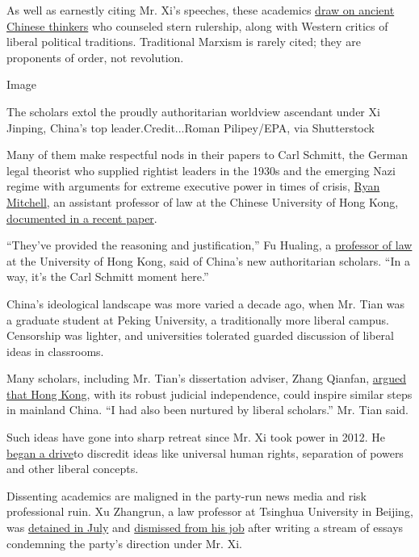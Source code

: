 As well as earnestly citing Mr. Xi's speeches, these academics
\href{http://www.ccps.gov.cn/bkjd/xzglgg/xzglgg2019_08/201909/t20190923_134457.shtml}{draw
on ancient Chinese thinkers} who counseled stern rulership, along with
Western critics of liberal political traditions. Traditional Marxism is
rarely cited; they are proponents of order, not revolution.

Image

The scholars extol the proudly authoritarian worldview ascendant under
Xi Jinping, China's top leader.Credit...Roman Pilipey/EPA, via
Shutterstock

Many of them make respectful nods in their papers to Carl Schmitt, the
German legal theorist who supplied rightist leaders in the 1930s and the
emerging Nazi regime with arguments for extreme executive power in times
of crisis,
\href{https://www.law.cuhk.edu.hk/app/people/prof-ryan-mitchell/}{Ryan
Mitchell}, an assistant professor of law at the Chinese University of
Hong Kong,
\href{https://papers.ssrn.com/sol3/papers.cfm?abstract_id=3400946}{documented
in a recent paper}.

``They've provided the reasoning and justification,'' Fu Hualing, a
\href{https://www.law.hku.hk/academic_staff/professor-fu-hualing/}{professor
of law} at the University of Hong Kong, said of China's new
authoritarian scholars. ``In a way, it's the Carl Schmitt moment here.''

China's ideological landscape was more varied a decade ago, when Mr.
Tian was a graduate student at Peking University, a traditionally more
liberal campus. Censorship was lighter, and universities tolerated
guarded discussion of liberal ideas in classrooms.

Many scholars, including Mr. Tian's dissertation adviser, Zhang Qianfan,
\href{http://www.calaw.cn/article/default.asp?id=1238}{argued that Hong
Kong}, with its robust judicial independence, could inspire similar
steps in mainland China. ``I had also been nurtured by liberal
scholars.'' Mr. Tian said.

Such ideas have gone into sharp retreat since Mr. Xi took power in 2012.
He
\href{https://www.nytimes.com/2013/08/20/world/asia/chinas-new-leadership-takes-hard-line-in-secret-memo.html}{began
a drive}to discredit ideas like universal human rights, separation of
powers and other liberal concepts.

Dissenting academics are maligned in the party-run news media and risk
professional ruin. Xu Zhangrun, a law professor at Tsinghua University
in Beijing, was
\href{https://www.nytimes.com/2020/07/12/world/asia/xu-zhangrun-china-xi.html}{detained
in July} and
\href{https://chinadigitaltimes.net/2020/07/xi-critic-xu-zhangrun-released-from-detention-fired-from-tsinghua-university/}{dismissed
from his job} after writing a stream of essays condemning the party's
direction under Mr. Xi.

